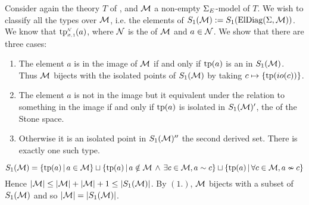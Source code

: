 \begin{eg}
    Consider again the theory $T$ of 
    ,
    and $\mathcal{M}$ a non-empty $\Sigma_E$-model of $T$. 
    We wish to classify all the types over $\mathcal{M}$, i.e. the elements of 
    $S_1(\mathcal{M}) := S_1(\mathrm{ElDiag}(\Sigma,\mathcal{M}))$.
    We know that
        $\subintp{\nothing,1}{\NN}{\tp}(a)$, 
    where $\mathcal{N}$ is the 
        of $\mathcal{M}$ and $a \in \mathcal{N}$.
    We show that there are three cases:
    \begin{enumerate}
        \item The element $a$ is in the image of $\mathcal{M}$ if and only if 
            $\operatorname{tp}(a)$ is an  
            in $S_1(\mathcal{M})$.
            Thus $\mathcal{M}$ bijects with the isolated points of $S_1(\mathcal{M})$
            by taking $c \mapsto \left\{\operatorname{tp}(io(c))\right\}$.
        \item The element $a$ is not in the image but it equivalent under the 
            relation to something
            in the image if and only if $\operatorname{tp}(a)$ is isolated in $S_1(\mathcal{M})'$,
            the  of the Stone space.
        \item Otherwise it is an isolated point 
            in $S_1(\mathcal{M})''$ the second derived set. 
            There is exactly one such type.
    \end{enumerate}
    \[  
        S_1(\mathcal{M}) = \left\{\operatorname{tp}(a) \,|\, a \in \mathcal{M}\right\} \sqcup 
        \left\{\operatorname{tp}(a) \,|\, a \notin \mathcal{M} \, \land \, \exists c \in \mathcal{M}, a \sim c\right\} \sqcup
        \left\{\operatorname{tp}(a) \,|\, \forall c \in \mathcal{M}, a \nsim c\right\}
    \]
    Hence $\left\vert \mathcal{M} \right\vert \leq \left\vert \mathcal{M} \right\vert + \left\vert \mathcal{M} \right\vert + 1 \leq \left\vert S_1(\mathcal{M}) \right\vert$.
    By $(1.)$, $\mathcal{M}$ bijects with a subset of $S_1(\mathcal{M})$ and so 
    $\left\vert \mathcal{M} \right\vert = \left\vert S_1(\mathcal{M}) \right\vert$.
\end{eg}
